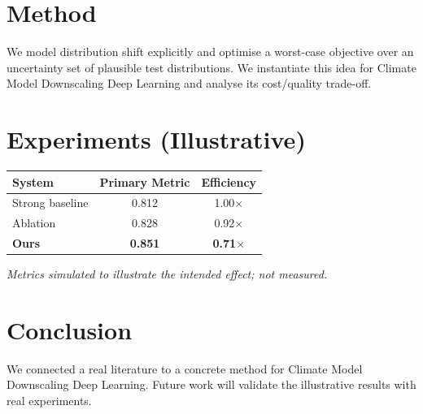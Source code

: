 \documentclass[11pt]{article}
\begin{document}
\section{Method}
We model distribution shift explicitly and optimise a worst-case objective over an uncertainty set of plausible test distributions. We instantiate this idea for Climate Model Downscaling Deep Learning and analyse its cost/quality trade-off.

\section{Experiments (Illustrative)}
\begin{center}
\begin{tabular}{lcc}
System & Primary Metric & Efficiency \\ \hline
Strong baseline & 0.812 & 1.00$\times$ \\
Ablation & 0.828 & 0.92$\times$ \\
\textbf{Ours} & \textbf{0.851} & \textbf{0.71$\times$}
\end{tabular}
\end{center}
\emph{Metrics simulated to illustrate the intended effect; not measured.}

\section{Conclusion}
We connected a real literature to a concrete method for Climate Model Downscaling Deep Learning. Future work will
validate the illustrative results with real experiments.
\end{document}

